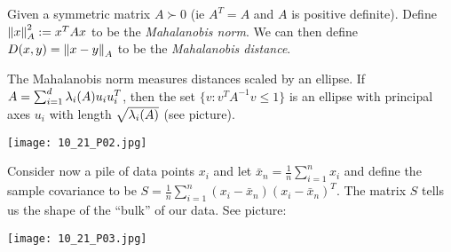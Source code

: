 \begin{defn}
    Given a symmetric matrix $A \succ 0$ (ie $A^T=A$ and $A$ is positive definite). Define $\left\|x\right\|_A^2 := x^TAx$ to be the \emph{Mahalanobis norm}. We can then define $D(x,y) = \left\|x-y\right\|_A$ to be the \emph{Mahalanobis distance}.
\end{defn}
The Mahalanobis norm measures distances scaled by an ellipse. If $A= \sum_{i=1}^d \lambda_i(A)u_iu_i^T$, then the set $\{v : v^TA^{-1}v \le 1 \}$ is an ellipse with principal axes $u_i$ with length $\sqrt{\lambda_i(A)}$ (see picture).

\begin{center}
    \texttt{[image: 10\_21\_P02.jpg]}
\end{center}

Consider now a pile of data points $x_i$ and let $\bar{x}_n =\frac{1}{n}\sum_{i=1}^n x_i$ and define the sample covariance to be $S=\frac{1}{n}\sum_{i=1}^n(x_i-\bar{x}_n)(x_i-\bar{x}_n)^T$. The matrix $S$ tells us the shape of the ``bulk'' of our data. See picture:

\begin{center}
    \texttt{[image: 10\_21\_P03.jpg]}
\end{center}

